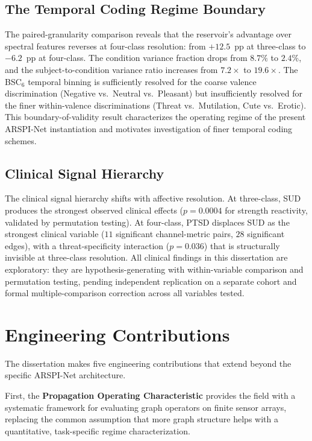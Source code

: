 \subsection{The Temporal Coding Regime Boundary}

The paired-granularity comparison reveals that the reservoir's advantage over spectral features reverses at four-class resolution: from $+12.5$~pp at three-class to $-6.2$~pp at four-class. The condition variance fraction drops from $8.7\%$ to $2.4\%$, and the subject-to-condition variance ratio increases from $7.2\times$ to $19.6\times$. The BSC$_6$ temporal binning is sufficiently resolved for the coarse valence discrimination (Negative vs.\ Neutral vs.\ Pleasant) but insufficiently resolved for the finer within-valence discriminations (Threat vs.\ Mutilation, Cute vs.\ Erotic). This boundary-of-validity result characterizes the operating regime of the present ARSPI-Net instantiation and motivates investigation of finer temporal coding schemes.

\subsection{Clinical Signal Hierarchy}

The clinical signal hierarchy shifts with affective resolution. At three-class, SUD produces the strongest observed clinical effects ($p = 0.0004$ for strength reactivity, validated by permutation testing). At four-class, PTSD displaces SUD as the strongest clinical variable ($11$ significant channel-metric pairs, $28$ significant edges), with a threat-specificity interaction ($p = 0.036$) that is structurally invisible at three-class resolution. All clinical findings in this dissertation are exploratory: they are hypothesis-generating with within-variable comparison and permutation testing, pending independent replication on a separate cohort and formal multiple-comparison correction across all variables tested.


\section{Engineering Contributions}

The dissertation makes five engineering contributions that extend beyond the specific ARSPI-Net architecture.

First, the \textbf{Propagation Operating Characteristic} provides the field with a systematic framework for evaluating graph operators on finite sensor arrays, replacing the common assumption that more graph structure helps with a quantitative, task-specific regime characterization.

